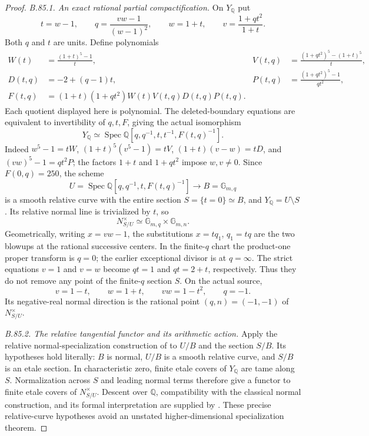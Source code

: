 \begin{proof}
\emph{B.85.1. An exact rational partial compactification.}
On $Y_{\mathbb Q}$ put
\[
 t=w-1,\qquad q=\frac{vw-1}{(w-1)^2},\qquad
 w=1+t,\qquad v=\frac{1+qt^2}{1+t}.
\]
Both $q$ and $t$ are units. Define polynomials
\[
\begin{aligned}
 W(t)&=\frac{(1+t)^5-1}{t},&
 V(t,q)&=\frac{(1+qt^2)^5-(1+t)^5}{t},\\
 D(t,q)&=-2+(q-1)t,&
 P(t,q)&=\frac{(1+qt^2)^5-1}{qt^2},\\
 F(t,q)&=(1+t)(1+qt^2)W(t)V(t,q)D(t,q)P(t,q).
\end{aligned}
\]
Each quotient displayed here is polynomial. The deleted-boundary equations
are equivalent to invertibility of $q,t,F$, giving the actual isomorphism
\[
 Y_{\mathbb Q}\simeq\operatorname{Spec}
       \mathbb Q[q,q^{-1},t,t^{-1},F(t,q)^{-1}].
\]
Indeed $w^5-1=tW$, $(1+t)^5(v^5-1)=tV$,
$(1+t)(v-w)=tD$, and $(vw)^5-1=qt^2P$; the factors
$1+t$ and $1+qt^2$ impose $w,v\ne0$.
Since $F(0,q)=250$, the scheme
\[
 U=\operatorname{Spec}\mathbb Q[q,q^{-1},t,F(t,q)^{-1}]
      \longrightarrow B=\mathbb G_{m,q}
\]
is a smooth relative curve with the entire section $S=\{t=0\}\simeq B$,
and $Y_{\mathbb Q}=U\setminus S$. Its relative normal line is trivialized by $t$,
so
\[
 N^\times_{S/U}\simeq\mathbb G_{m,q}\times\mathbb G_{m,n}.
\]
Geometrically, writing $x=vw-1$, the substitutions $x=tq_1$, $q_1=tq$
are the two blowups at the rational successive centers. In the finite-$q$
chart the product-one proper transform is $q=0$; the earlier exceptional
divisor is at $q=\infty$. The strict equations $v=1$ and $v=w$ become
$qt=1$ and $qt=2+t$, respectively. Thus they do not remove any point of
the finite-$q$ section $S$. On the actual source,
\[
 v=1-t,\qquad w=1+t,\qquad vw=1-t^2,\qquad q=-1.
\]
Its negative-real normal direction is the rational point
$(q,n)=(-1,-1)$ of $N^\times_{S/U}$.

\emph{B.85.2. The relative tangential functor and its arithmetic action.}
Apply the relative normal-specialization construction of
\citet[\S15.19]{BDeligne1989} to $U/B$ and the section $S/B$.
Its hypotheses hold literally: $B$ is normal, $U/B$ is a smooth relative
curve, and $S/B$ is an etale section. In characteristic zero, finite etale
covers of $Y_{\mathbb Q}$ are tame along $S$. Normalization across $S$ and leading
normal terms therefore give a functor to finite etale covers of
$N^\times_{S/U}$. Descent over $\mathbb Q$, compatibility with the
classical normal construction, and its formal interpretation are supplied
by \citet[\S\S15.17--15.19, 15.22--15.26]{BDeligne1989}.
These precise relative-curve hypotheses avoid an unstated
higher-dimensional specialization theorem.


\end{proof}
